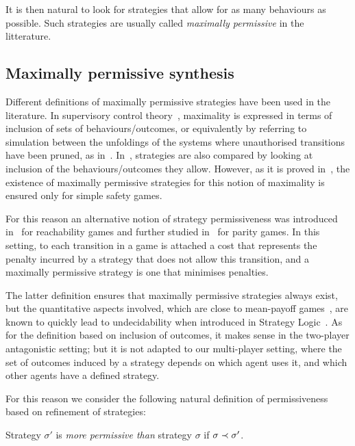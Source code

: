 It is then natural to look for  strategies that allow for as many
behaviours as possible. Such strategies are usually called
\emph{maximally permissive} in the litterature.



\subsection{Maximally permissive synthesis}
\label{sec-max-perm}

Different definitions of maximally permissive strategies have been used
in the literature. In supervisory control
theory~\cite{ramadge1987supervisory}, maximality is expressed in terms
of inclusion of sets of behaviours/outcomes, or equivalently by
referring to simulation between the unfoldings of the systems where
unauthorised transitions have been pruned, as
in~\cite{pinchinat2005you}.  In~\cite{bernet2002permissive},
strategies are also compared by looking at inclusion of the behaviours/outcomes they allow. However, as it is proved
in~\cite{bernet2002permissive}, the existence of maximally permissive
strategies for this notion of maximality is ensured only for simple
safety games.

For this reason an alternative notion of strategy
permissiveness was introduced in~\cite{bouyer2009measuring} for
reachability games and further studied in~\cite{bouyer2011measuring}
for parity games. In this setting, to each transition in a game is
attached a cost that represents the penalty incurred by a strategy
that does not allow this transition, and a maximally permissive
strategy is one that minimises penalties.

The latter definition ensures that
maximally permissive strategies always exist, but the quantitative
aspects involved, which are close to mean-payoff
games~\cite{ehrenfeucht1979positional,gurvich1988cyclic}, are known to
quickly lead to undecidability when introduced in Strategy Logic~\cite{gardy2017semantics}.
As for the definition based on inclusion of outcomes, it makes sense in the
two-player antagonistic setting; but it is not adapted to our multi-player setting, where the set of
outcomes induced by a strategy depends on which agent uses it, and
which other agents have a defined strategy.

For this reason we consider the following natural definition of permissiveness based on refinement
of strategies:
\begin{definition}
  \label{def-permissive}
  Strategy $\sigma'$ is \emph{more permissive than} strategy $\sigma$
  if $\sigma\prec\sigma'$. 
\end{definition}

